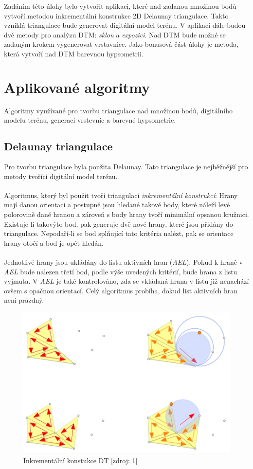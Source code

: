 \documentclass[a4paper, 12pt]{article}
\begin{document}
Zadáním této úlohy bylo vytvořit aplikaci, které nad zadanou množinou bodů vytvoří metodou inkrementální konstrukce 2D Delaunay triangulace. Takto vzniklá triangulace bude generovat digitální model terénu. V aplikaci dále budou dvě metody pro analýzu DTM: \textit{sklon} a \textit{expozici}. Nad DTM bude možné se zadaným krokem vygenerovat vrstavnice. Jako bonusová část úlohy je metoda, která vytvoří nad DTM barevnou hypsometrii.

\section{Aplikované algoritmy}
Algoritmy využívané pro tvorbu triangulace nad množinou bodů, digitálního modelu terénu, generaci vrstevnic a barevné hypsometrie.

\subsection{Delaunay triangulace}
Pro tvorbu triangulace byla použita Delaunay. Tato triangulace je nejběžnější pro metody tvořící digitální model terénu.\\
\\
Algoritmus, který byl použit tvoří triangulaci \textit{inkrementální konstrukcí}: Hrany mají danou orientaci a postupně jsou hledané takové body, které náleží levé polorovině dané hranou a zároveň s body hrany tvoří minimální opsanou kružnici.  Existuje-li takovýto bod, pak generuje dvě nové hrany, které jsou přidány do triangulace. Nepodaří-li se bod splňující tato kritéria nalézt, pak se orientace hrany otočí a bod je opět hledán. \\
\\
Jednotlivé hrany jsou ukládány do listu aktivních hran (\textit{AEL}). Pokud k hraně v \textit{AEL} bude nalezen třetí bod, podle výše uvedených kritérií, bude hrana z listu vyjmuta. V \textit{AEL} je také kontrolováno, zda se vkládaná hrana v listu již nenachází ovšem s opačnou orientací. Celý algoritmus probíha, dokud list aktivních hran není prázdný. 

\begin{figure}[h!]
	\centering
	\includegraphics[width=12cm]{inkrementalni_triangulace.jpg}
	\caption{Inkrementální konstukce DT [zdroj: 1]}
\end{figure}
\end{document}
